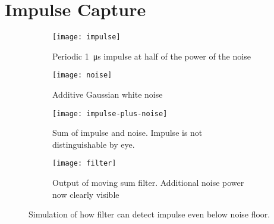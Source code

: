 \section{Impulse Capture}

\begin{figure}
  \begin{subfigure}{\textwidth}
    \centering
    \texttt{[image: impulse]}
    \caption{Periodic \SI{1}{\micro\second} impulse at half of the power of the noise}
  \end{subfigure}
  \begin{subfigure}{\textwidth}
    \centering
    \texttt{[image: noise]}
    \caption{Additive Gaussian white noise}
  \end{subfigure}
  \begin{subfigure}{\textwidth}
    \centering
    \texttt{[image: impulse-plus-noise]}
    \caption{Sum of impulse and noise. Impulse is not distinguishable by eye.}
  \end{subfigure}
  \begin{subfigure}{\textwidth}
    \centering
    \texttt{[image: filter]}
    \caption{Output of moving sum filter. Additional noise power now clearly visible}
  \end{subfigure}
  \caption{Simulation of how filter can detect impulse even below noise floor.}
\end{figure}
